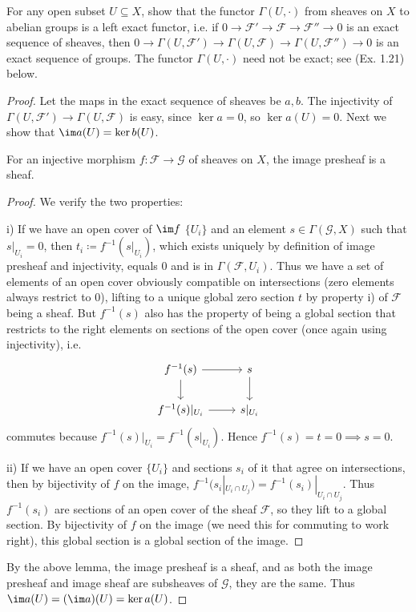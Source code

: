 \begin{exercise}%
	For any open subset $U \subseteq X $, show that the functor $\Gamma(U,\cdot) $ from sheaves on $X $ to abelian groups is a left exact functor, i.e. if $0 \to \mathscr{F}' \to \mathscr{F} \to \mathscr{F}'' \to 0 $ is an exact sequence of sheaves, then $0 \to \Gamma(U,\mathscr{F}') \to \Gamma(U,\mathscr{F}) \to \Gamma(U,\mathscr{F}'') \to 0 $ is an exact sequence of groups. The functor $\Gamma(U,\cdot) $ need not be exact; see (Ex. 1.21) below.
\end{exercise}
\begin{proof}
	Let the maps in the exact sequence of sheaves be $a,b $.
	The injectivity of $\Gamma(U,\mathscr{F}') \to \Gamma(U,\mathscr{F}) $ is easy, since $\ker a = 0$, so $\ker a(U) = 0 $.
	Next we show that $\im a(U) = \ker b(U) $.

	\begin{lem}\label{lem:injsheaf}
		For an injective morphism $f: \mathscr{F}\to \mathscr{G} $ of sheaves on $X $, the image presheaf is a sheaf.
	\end{lem}
	\begin{proof}
		We verify the two properties:

		i) If we have an open cover of $\im f $ $\{U_i\}   $ and an element $s \in \Gamma(\mathscr{G},X)$ such that $s|_{U_i} = 0 $, then $t_i \coloneqq f^{-1}(s|_{U_i}) $, which exists uniquely by definition of image presheaf and injectivity, equals 0 and is in $\Gamma(\mathscr{F},U_i) $.
		Thus we have a set of elements of an open cover obviously compatible on intersections (zero elements always restrict to $0 $), lifting to a unique global zero section $t $ by property i) of $\mathscr{F} $ being a sheaf.
		But $f^{-1}(s) $ also has the property of being a global section that restricts to the right elements on sections of the open cover (once again using injectivity), i.e.
		\[
		\begin{tikzcd}
		f^{-1}(s) & s\\
		f^{-1}(s)|_{U_i} & s|_{U_i}
		\arrow[from=1-1,to=1-2]
		\arrow[from=1-1,to=2-1]
		\arrow[from=2-1,to=2-2]
		\arrow[from=1-2,to=2-2]
		\end{tikzcd}
		\]
		commutes because $f^{-1}(s)|_{U_i} = f^{-1}(s|_{U_i}) $.
		Hence $f^{-1}(s) = t = 0 \implies s = 0 $.

		ii) If we have an open cover $\{U_i\}   $ and sections $s_i $ of it that agree on intersections, then by bijectivity of $f $ on the image, $f^{-1}(s_i|_{U_i\cap U_j}) = f^{-1}(s_i)|_{U_i\cap U_j} $.
		Thus $f^{-1}(s_i) $ are sections of an open cover of the sheaf $\mathscr{F} $, so they lift to a global section.
		By bijectivity of $f $ on the image (we need this for commuting to work right), this global section is a global section of the image.
	\end{proof}

	By the above lemma, the image presheaf is a sheaf, and as both the image presheaf and image sheaf are subsheaves of $\mathscr{G} $, they are the same.
	Thus $\im a(U) = (\im a)(U) = \ker a(U) $.
\end{proof}

